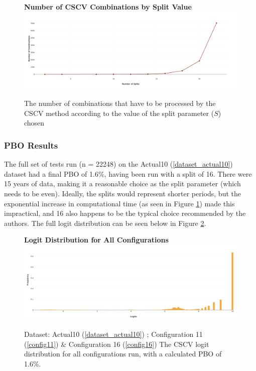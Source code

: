 \documentclass[a4paper,11pt,oneside]{article}
\theoremstyle{plain}
\theoremstyle{definition}
\begin{document}
	\begin{figure}[H]
		\centering 
		\textbf{Number of CSCV Combinations by Split Value}
		\includegraphics[scale=0.25]{images/results/pbo/combination_sizes.png} 
		\caption[Number of CSCV Combinations by Split Value]{
			\newline The number of combinations that have to be processed by the CSCV method according to the value of the split parameter ($S$) chosen}
		\label{figure-s_combinations}
	\end{figure}
	
	
	\subsubsection{PBO Results}
	
	
	The full set of tests run (n = 22248) on the Actual10 (\ref{dataset_actual10}) dataset had a final PBO of 1.6\%, having been run with a split of 16. There were 15 years of data, making it a reasonable choice as the split parameter (which needs to be even). Ideally, the splits would represent shorter periods, but the exponential increase in computational time (as seen in Figure \ref{figure-s_combinations}) made this impractical, and 16 also happens to be the typical choice recommended by the authors. The full logit distribution can be seen below in Figure \ref{figure-results_logits_all}.
	
	\begin{figure}[H]
		\centering 
		\textbf{Logit Distribution for All Configurations}
		\includegraphics[scale=0.25]{images/results/pbo/all_sets_dist.png} 
		\caption[Logit Distribution for All Configurations]{Dataset: Actual10 (\ref{dataset_actual10}) ; Configuration 11 (\ref{config11}) \&  Configuration 16 (\ref{config16})
			\newline The CSCV logit distribution for all configurations run, with a calculated PBO of 1.6\%.}
		\label{figure-results_logits_all}
	\end{figure}
	
\end{document}
